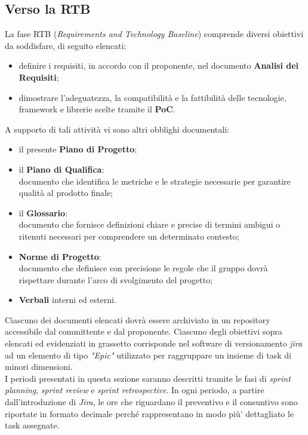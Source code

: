 \subsection{Verso la RTB}
La fase RTB (\emph{Requirements and Technology Baseline}) comprende diversi obiettivi da soddisfare, di seguito elencati:
\begin{itemize}
    \item definire i requisiti, in accordo con il proponente, nel documento \textbf{Analisi dei Requisiti};
    \item dimostrare l'adeguatezza, la compatibilità e la fattibilità delle tecnologie, framework e librerie scelte tramite il \textbf{PoC}.
\end{itemize}
A supporto di tali attività vi sono altri obblighi documentali:
\begin{itemize}
    \item il presente \textbf{Piano di Progetto};
    \item il \textbf{Piano di Qualifica}:\\
    documento che identifica le metriche e le strategie necessarie per garantire qualità al prodotto finale;
    \item il \textbf{Glossario}:\\
    documento che fornisce definizioni chiare e precise di termini ambigui o ritenuti necessari per comprendere un determinato contesto;
    \item \textbf{Norme di Progetto}:\\
    documento che definisce con precisione le regole che il gruppo dovrà rispettare durante l'arco di svolgimento del progetto;
    \item \textbf{Verbali} interni ed esterni.
\end{itemize}
Ciascuno dei documenti elencati dovrà essere archiviato in un  repository accessibile dal committente e dal proponente. Ciascuno degli obiettivi sopra elencati ed evidenziati in grassetto corrisponde nel software di versionamento \emph{jira} ad un elemento di tipo \emph{"Epic"} utilizzato per raggruppare un insieme di task di minori dimensioni.\\
I periodi presentati in questa sezione saranno descritti tramite le fasi di \emph{sprint planning}, \emph{sprint review} e \emph{sprint retrospective}. In ogni periodo, a partire dall'introduzione di \emph{Jira}, le ore che riguardano il preventivo e il consuntivo sono riportate in formato decimale perché rappresentano in modo più' dettagliato le task assegnate.

\newpage

\newpage

\newpage

\newpage

\newpage

\newpage

\newpage

\newpage

\newpage


